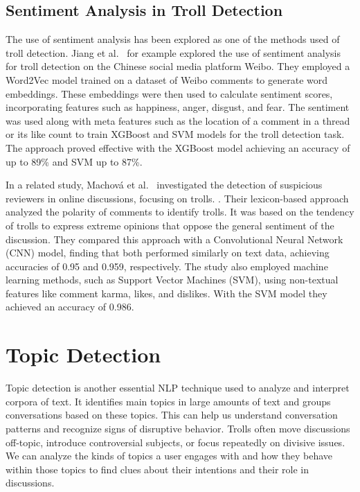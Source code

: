 \documentclass[twoside]{ctuthesis}
\theoremstyle{plain}
\theoremstyle{definition}
\theoremstyle{note}
\begin{document}
\subsection{Sentiment Analysis in Troll Detection}
The use of sentiment analysis has been explored as one of the methods used of troll detection. Jiang et al.~\cite{Jiang2021Sentiment} for example explored the use of sentiment analysis for troll detection on the Chinese social media platform Weibo.  They employed a Word2Vec model trained on a dataset of Weibo comments to generate word embeddings. These embeddings were then used to calculate sentiment scores, incorporating features such as happiness, anger, disgust, and fear. The sentiment was used along with meta features such as the location of a comment in a thread or its like count to train XGBoost and SVM models for the troll detection task. The approach proved effective with the XGBoost model achieving an accuracy of up to 89\% and SVM up to 87\%.\par
In a related study, Machová et al.~\cite{Machova2022Comparison} investigated the detection of suspicious reviewers in online discussions, focusing on trolls. . Their lexicon-based approach analyzed the polarity of comments to identify trolls. It was based on the tendency of trolls to express extreme opinions that oppose the general sentiment of the discussion. They compared this approach with a Convolutional Neural Network (CNN) model, finding that both performed similarly on text data, achieving accuracies of 0.95 and 0.959, respectively.  The study also employed machine learning methods, such as Support Vector Machines (SVM), using non-textual features like comment karma, likes, and dislikes. With the SVM model they achieved an accuracy of 0.986.

\section{Topic Detection}
Topic detection is another essential NLP technique used to analyze and interpret corpora of text. It identifies main topics in large amounts of text and groups conversations based on these topics. This can help us understand conversation patterns and recognize signs of disruptive behavior. Trolls often move discussions off-topic, introduce controversial subjects, or focus repeatedly on divisive issues. We can analyze the kinds of topics a user engages with and how they behave within those topics to find clues about their intentions and their role in discussions.\par
\end{document}
